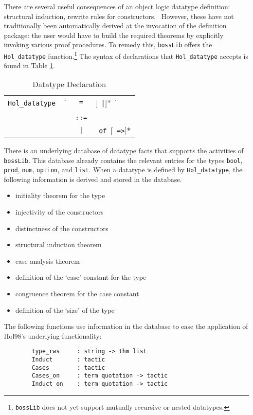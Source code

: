 There are several useful consequences of an object logic datatype
definition: structural induction, rewrite rules for constructors, \etc\
However, these have not traditionally been automatically derived
at the invocation of the definition package: the user would have to
build the required theorems by explicitly invoking various proof
procedures.  To remedy this, \verb+bossLib+ offers the
\verb+Hol_datatype+ function.\footnote{\verb+bossLib+ does not yet
support mutually recursive or nested datatypes.} The syntax of 
declarations that \verb+Hol_datatype+ accepts is found in Table
\ref{datatype}. 
\begin{table}[h]
\begin{center}
\begin{tabular}{|rcl|} \hline
\verb+Hol_datatype +\ \verb+`+\ident & \verb+=+ & [\clause\ \verb+|+]* \clause\verb+`+ \\
       & & \\
\clause & \verb+::=+ & \ident \\
        & \verb+|+ & \ident\ \verb+of+\ [\type\ \verb+=>+]* \type\\ \hline
\end{tabular}
\caption{Datatype Declaration}\label{datatype}
\end{center}
\end{table}

There is an underlying database of datatype facts that supports the
activities of \verb+bossLib+. This database already contains the
relevant entries for the types \verb+bool+, \verb+prod+, \verb+num+,
\verb+option+, and \verb+list+.  When a datatype is defined by
\verb+Hol_datatype+, the following information is derived and stored in
the database.

\begin{itemize}
\item initiality theorem for the type
\item injectivity of the constructors
\item distinctness of the constructors
\item structural induction theorem
\item case analysis theorem
\item definition of the `case' constant for the type
\item congruence theorem for the case constant 
\item definition of the `size' of the type
\end{itemize}

The following functions use information in the database to ease the
application of Hol98's underlying functionality:
\begin{verbatim}
        type_rws     : string -> thm list
        Induct       : tactic
        Cases        : tactic
        Cases_on     : term quotation -> tactic
        Induct_on    : term quotation -> tactic
\end{verbatim}


